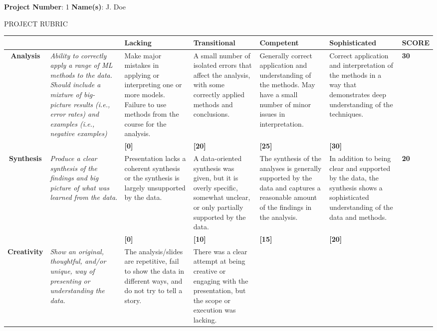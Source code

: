 \documentclass[10pt, a4paper]{article}
\makeatletter
\newcommand{\magenta}[1]{\textcolor{solarized@magenta}{#1}}
\makeatother
\begin{document}
\fontsize{8pt}{10pt}\selectfont

\textbf{Project Number}: 1 \hspace{3cm} \textbf{Name(s)}: J. Doe 

\begin{center}
PROJECT RUBRIC
\end{center}

\begin{tabular}{C | L | L | L | L | L | E}
  & & \textbf{Lacking} & \textbf{Transitional} & \textbf{Competent} & \textbf{Sophisticated} & \textbf{SCORE} \\ \hline
 \textbf{Analysis} & \textit{Ability to correctly apply a range of ML methods to the data. Should include a mixture of big- picture results (i.e., error rates) and examples (i.e., negative examples)} &
 Make major mistakes in applying or interpreting one or more models. Failure to use methods from the course for the analysis. & 
 A small number of isolated errors that affect the analysis, with some correctly applied methods and conclusions. &
 Generally correct application and understanding of the methods. May have a small number of minor issues in interpretation. &
 Correct application and interpretation of the methods in a way that demonstrates deep understanding of the techniques. &
 {\large \textbf{\magenta{30}}} \\
&&\textbf{[0]}&\textbf{[20]}&\textbf{[25]}&\textbf{[30]}& \\
 \hline
 \textbf{Synthesis} & \textit{Produce a clear synthesis of the findings and big picture of what was learned from the data.} &
 Presentation lacks a coherent synthesis or the synthesis is largely unsupported by the data. & 
 A data-oriented synthesis was given, but it is overly specific, somewhat unclear, or only partially supported by the data. &
 The synthesis of the
analyses is generally supported by the data and captures a reasonable amount of the findings in the analysis. &
 In addition to being clear and supported by the data, the synthesis shows a sophisticated understanding of the data and methods. &
  {\large \textbf{\magenta{20}}}\\
&&\textbf{[0]}&\textbf{[10]}&\textbf{[15]}&\textbf{[20]}& \\
 \hline
 \textbf{Creativity} & \textit{Show an original, thoughtful, and/or unique, way of presenting or understanding the data.} &
 The analysis/slides are repetitive, fail to show the data in different ways, and do not try to tell a story. & 
 There was a clear attempt at being creative or engaging with the presentation, but the scope or execution was lacking. &

\end{tabular}
\end{document}
